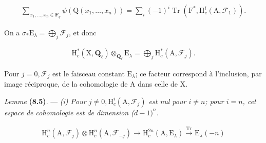 \documentclass[10pt,leqno]{article}
\begin{document}
\begin{equation*}\begin{gathered}\sum _{x_{1},\ldots ,x_{n} \in  \mathbf{F}_{q}} \psi (\mathrm{Q}(x_{1},\ldots ,x_{n})) = \sum _{i} (-1)^{i} \operatorname{Tr}(\mathrm{F}^{*}, \mathrm{H}_{c}^{i}(\mathrm{A},\mathcal{F} _{1})).\end{gathered}\tag{8.4.2}\end{equation*}

\noindent On a \(\sigma _{*}\mathrm{E}_{\lambda } = \bigoplus\limits_{j} \mathcal{F} _{j}\), et donc\par

\begin{equation*}\begin{gathered}\mathrm{H}_{c}^{*}(\mathrm{X},\mathbf{Q}_{\ell }) \otimes _{\mathbf{Q}_{\ell }} \mathrm{E}_{\lambda } = \bigoplus\limits_{j} \mathrm{H}_{c}^{*}(\mathrm{A},\mathcal{F} _{j}).\end{gathered}\tag{8.4.3}\end{equation*}

\noindent Pour \(j = 0, \mathcal{F} _{j}\) est le faisceau constant \(\mathrm{E}_{\lambda }\); ce facteur correspond à l'inclusion, par image réciproque, de la cohomologie de \(\mathrm{A}\) dans celle de \(\mathrm{X}\).\par

\noindent \emph{Lemme} \textbf{(8.5)}. — {\itshape \textup{(i)} Pour \(j \ne  0, \mathrm{H}_{c}^{i}(\mathrm{A},\mathcal{F} _{j})\) est nul pour \(i \ne  n\); pour \(i = n\), cet espace de cohomologie est de dimension (\(d-1)^{n}\).}\par

\par

\begin{equation*}\begin{gathered}\mathrm{H}_{c}^{n}(\mathrm{A},\mathcal{F} _{j}) \otimes  \mathrm{H}_{c}^{n}(\mathrm{A},\mathcal{F} _{-j}) \longrightarrow  \mathrm{H}_{c}^{2n}(\mathrm{A},\mathrm{E}_{\lambda }) \xrightarrow{\operatorname{Tr}} \mathrm{E}_{\lambda }(-n)\end{gathered}\end{equation*}

\par

\par
\end{document}
